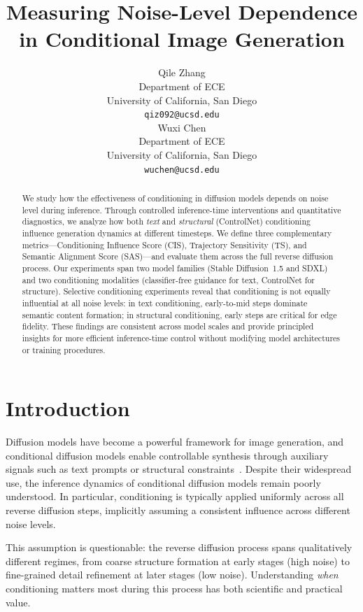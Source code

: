 \documentclass{article}
\title{Measuring Noise-Level Dependence in Conditional Image Generation}
\author{%
  Qile Zhang \\
  Department of ECE \\
  University of California, San Diego \\
  \texttt{qiz092@ucsd.edu} \\
  \And
  Wuxi Chen \\
  Department of ECE \\
  University of California, San Diego \\
  \texttt{wuchen@ucsd.edu} \\
}
\begin{document}
\maketitle

\begin{abstract}
We study how the effectiveness of conditioning in diffusion models depends on noise level during inference. Through controlled inference-time interventions and quantitative diagnostics, we analyze how both \emph{text} and \emph{structural} (ControlNet) conditioning influence generation dynamics at different timesteps. We define three complementary metrics---Conditioning Influence Score (CIS), Trajectory Sensitivity (TS), and Semantic Alignment Score (SAS)---and evaluate them across the full reverse diffusion process. Our experiments span two model families (Stable Diffusion~1.5 and SDXL) and two conditioning modalities (classifier-free guidance for text, ControlNet for structure). Selective conditioning experiments reveal that conditioning is not equally influential at all noise levels: in text conditioning, early-to-mid steps dominate semantic content formation; in structural conditioning, early steps are critical for edge fidelity. These findings are consistent across model scales and provide principled insights for more efficient inference-time control without modifying model architectures or training procedures.
\end{abstract}

\section{Introduction}
\label{sec:intro}

Diffusion models have become a powerful framework for image generation, and conditional diffusion models enable controllable synthesis through auxiliary signals such as text prompts or structural constraints~\citep{ho2020denoising, rombach2022high}. Despite their widespread use, the inference dynamics of conditional diffusion models remain poorly understood. In particular, conditioning is typically applied uniformly across all reverse diffusion steps, implicitly assuming a consistent influence across different noise levels.

This assumption is questionable: the reverse diffusion process spans qualitatively different regimes, from coarse structure formation at early stages (high noise) to fine-grained detail refinement at later stages (low noise). Understanding \emph{when} conditioning matters most during this process has both scientific and practical value.
\end{document}
